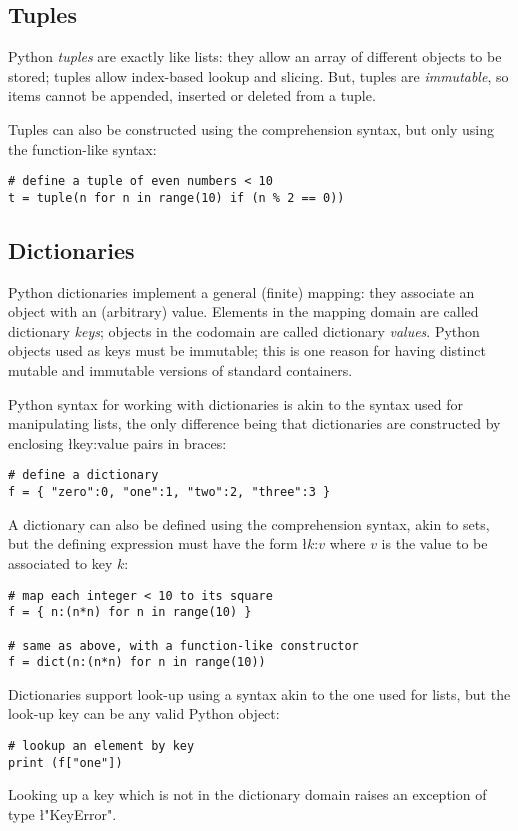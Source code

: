 \subsection{Tuples}
\label{sec:tuples}

Python \emph{tuples} are exactly like lists: they allow an array of
different objects to be stored; tuples allow index-based lookup and
slicing. But, tuples are \emph{immutable}, so items cannot be
appended, inserted or deleted from a tuple.

Tuples can also be constructed using the comprehension syntax, but
only using the function-like syntax:
\begin{lstlisting}
# define a tuple of even numbers < 10
t = tuple(n for n in range(10) if (n % 2 == 0))
\end{lstlisting}


\subsection{Dictionaries}
\label{sec:dicts}

Python dictionaries implement a general (finite) mapping: they
associate an object with an (arbitrary) value.  Elements in the
mapping domain are called dictionary \emph{keys}; objects in the
codomain are called dictionary \emph{values}.  Python objects used as
keys must be immutable; this is one reason for having distinct mutable
and immutable versions of standard containers.

Python syntax for working with dictionaries is akin to the syntax used
for manipulating lists, the only difference being that dictionaries
are constructed by enclosing \l{key:value} pairs in braces:
\begin{lstlisting}
# define a dictionary
f = { "zero":0, "one":1, "two":2, "three":3 }
\end{lstlisting}
A dictionary can also be defined using the comprehension syntax,
akin to sets, but the defining expression must have the form
\l{$k$:$v$} where $v$ is the value to be associated to key $k$:
\begin{lstlisting}
# map each integer < 10 to its square
f = { n:(n*n) for n in range(10) }

# same as above, with a function-like constructor
f = dict(n:(n*n) for n in range(10))
\end{lstlisting}

Dictionaries support look-up using a syntax akin to the one used for
lists, but the look-up key can be any valid Python object:
\begin{lstlisting}
# lookup an element by key
print (f["one"])
\end{lstlisting}
Looking up a key which is not in the dictionary domain raises an
exception of type \l"KeyError".

